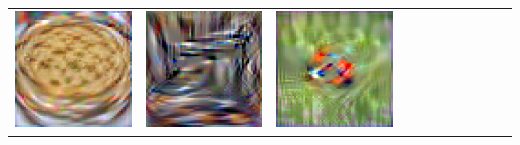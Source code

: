\documentclass[main.tex]{subfiles}
\begin{document}
{\begin{center}
\begin{tabular}{ccccccccccc}
    \includegraphics[align=c,width=\coverwidth\linewidth]{figures/cover/tiny/potpie_0.pdf} &
    \includegraphics[align=c,width=\coverwidth\linewidth]{figures/cover/tiny/sewing_machine_0.pdf} &
    \includegraphics[align=c,width=\coverwidth\linewidth]{figures/cover/tiny/ladybug_0.pdf} &

\end{tabular}
\end{center}}
\end{document}
